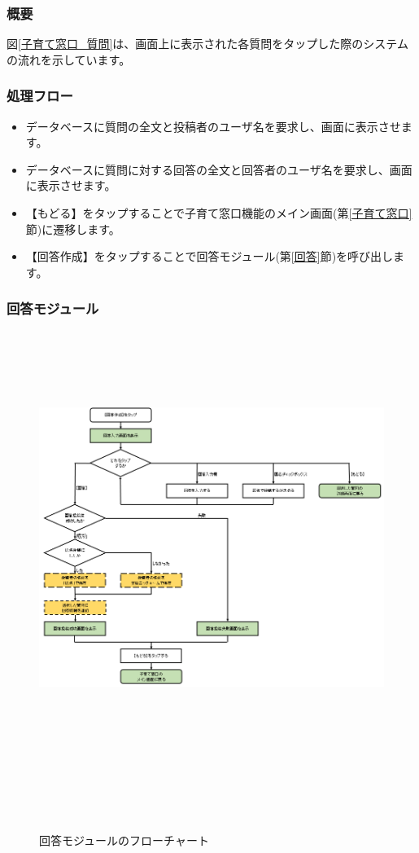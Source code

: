 \documentclass[a4j]{jarticle}
\begin{document}
\subsubsection*{概要}
図\ref{子育て窓口_質問}は、画面上に表示された各質問をタップした際のシステムの流れを示しています。
\subsubsection*{処理フロー}
\begin{itemize}
\item データベースに質問の全文と投稿者のユーザ名を要求し、画面に表示させます。
\item データベースに質問に対する回答の全文と回答者のユーザ名を要求し、画面に表示させます。
\item 【もどる】をタップすることで子育て窓口機能のメイン画面(第\ref{子育て窓口}節)に遷移します。
\item 【回答作成】をタップすることで回答モジュール(第\ref{回答}節)を呼び出します。

\end{itemize}

\subsubsection{回答モジュール\label{回答}} %
\begin{figure}[H]
    \begin{center}
      \includegraphics[height = 14.0cm] {子育て窓口_回答.png} %
    \caption {回答モジュールのフローチャート}
    \label{子育て窓口_回答}　
    \end{center}　
\end{figure}
\end{document}
